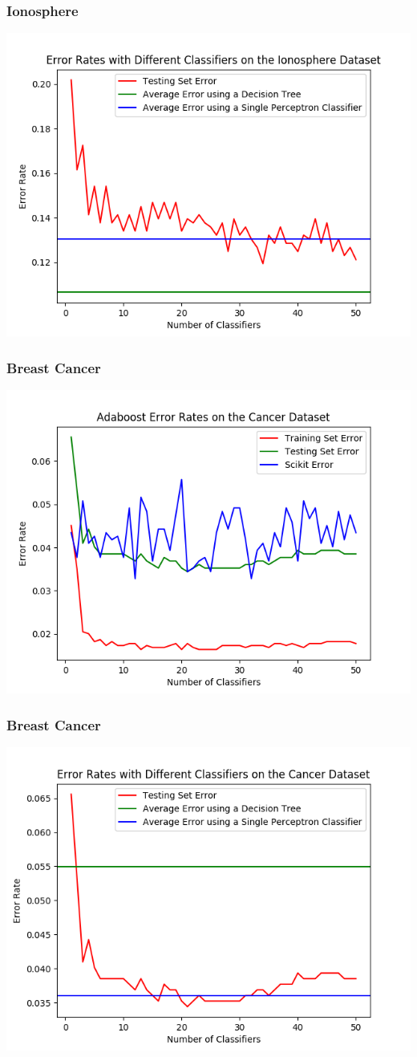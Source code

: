 \documentclass{beamer}
\begin{document}
\begin{frame}
\frametitle{Ionosphere}
\begin{center}
\includegraphics[width=0.8\linewidth]{Ionosphere_different_classifiers_1.png}
\end{center}
\end{frame}
\begin{frame}
\frametitle{Breast Cancer}
\begin{center}
\includegraphics[width=0.8\linewidth]{Cancer_1.png}
\end{center}
\end{frame}
\begin{frame}
\frametitle{Breast Cancer}
\begin{center}
\includegraphics[width=0.8\linewidth]{Cancer_different_classifiers_1.png}
\end{center}
\end{frame}
\end{document}

